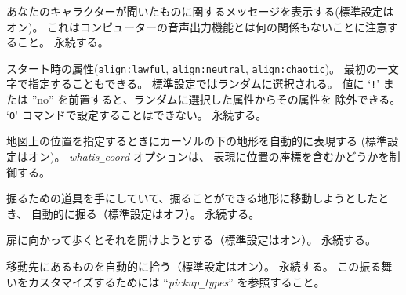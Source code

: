 \blist{}
\item[\ib{acoustics}]
あなたのキャラクターが聞いたものに関するメッセージを表示する(標準設定はオン)。
これはコンピューターの音声出力機能とは何の関係もないことに注意すること。
永続する。
\item[\ib{align}]
スタート時の属性({\tt align:lawful}, {\tt align:neutral},
{\tt align:chaotic})。
最初の一文字で指定することもできる。
標準設定ではランダムに選択される。
値に `{\tt !}' または ''no'' を前置すると、ランダムに選択した属性からその属性を
除外できる。
`{\tt O}' コマンドで設定することはできない。
永続する。
\item[\ib{autodescribe}]
地図上の位置を指定するときにカーソルの下の地形を自動的に表現する
(標準設定はオン)。
{\it whatis\verb+_+coord\/} オプションは、
表現に位置の座標を含むかどうかを制御する。
\item[\ib{autodig}]
掘るための道具を手にしていて、掘ることができる地形に移動しようとしたとき、
自動的に掘る（標準設定はオフ）。
永続する。
\item[\ib{autoopen}]
扉に向かって歩くとそれを開けようとする（標準設定はオン）。
永続する。
\item[\ib{autopickup}]
移動先にあるものを自動的に拾う（標準設定はオン）。
永続する。
この振る舞いをカスタマイズするためには
``{\it pickup\verb+_+types\/}'' を参照すること。
\item[\ib{autoquiver}]
